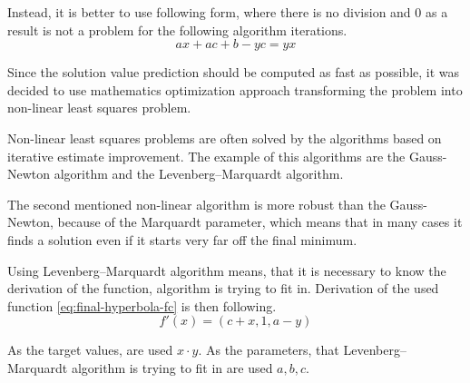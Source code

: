 Instead,
it is better to use following form, 
where there is no division and $0$ as a result is not a problem for the following algorithm iterations.
\begin{equation}\label{eq:final-hyperbola-fc}
    ax + ac + b - yc = yx
\end{equation}

Since the solution value prediction should be computed as fast as possible,
it was decided to use mathematics optimization approach transforming the problem into non-linear least squares problem.

Non-linear least squares problems are often solved by the algorithms based on iterative estimate improvement. 
The example of this algorithms are the Gauss-Newton algorithm\cite{gratton2007approximate} 
and the Levenberg–Marquardt algorithm\cite{marquardt1963algorithm}.

\noindent %
The second mentioned non-linear algorithm is more robust than the Gauss-Newton, 
because of the Marquardt parameter\cite{marquardt1963algorithm},
which means that in many cases it finds a solution even if it starts very far off the final minimum.

Using Levenberg–Marquardt algorithm means, 
that it is necessary to know the derivation of the function, 
algorithm is trying to fit in.
Derivation of the used function \ref{eq:final-hyperbola-fc} is then following.
\begin{equation}\label{eq:final-hyperbola-fd}
    f'(x) = (c+x, 1, a-y)
\end{equation}

As the target values, are used $x \cdot y$.
As the parameters, that Levenberg–Marquardt algorithm is trying to fit in are used $a,b,c$.